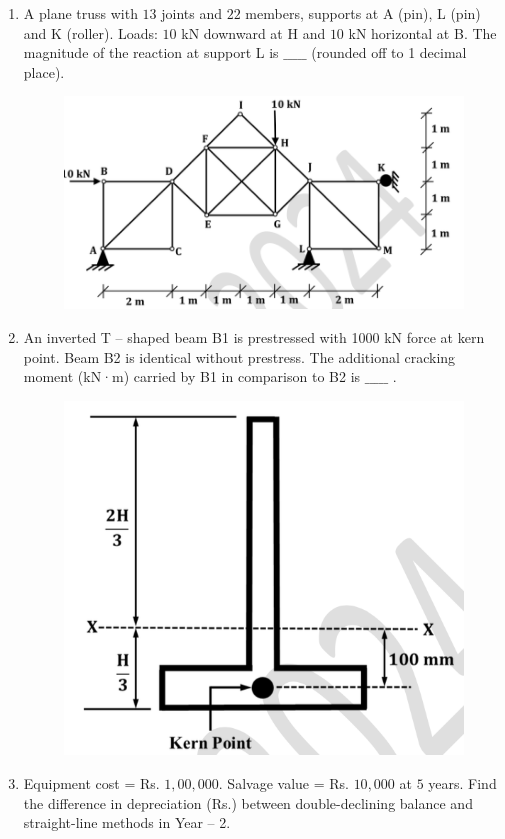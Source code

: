 \documentclass[journal]{IEEEtran}
\begin{document}
\begin{enumerate}
\item A plane truss with $13$ joints and $22$ members, supports at A (pin), L (pin) and K (roller). Loads: $10$ kN downward at H and $10$ kN horizontal at B. The magnitude of the reaction  at support L is $\_\_\_\_\_$ (rounded off to 1 decimal place).  
\hfill {}  
\begin{figure}[H]
    \centering
    \includegraphics[width=0.6\columnwidth]{figs/Q49.png} 
    \caption{}
    \label{fig:placeholder}
\end{figure}


\item An inverted T -- shaped beam B1 is prestressed with 1000 kN force at kern point. Beam B2 is identical without prestress. The additional cracking moment (kN·m) carried by B1 in comparison to B2 is $\_\_\_\_\_$ .  
\hfill {}  

\begin{figure}[H]
    \centering
    \includegraphics[width=0.6\columnwidth]{figs/Q50.png} 
    \caption{}
    \label{fig:placeholder}
\end{figure}

\item Equipment cost = Rs. $1,00,000$. Salvage value = Rs. $10,000$ at $5$ years. Find the difference in depreciation (Rs.) between double-declining balance and straight-line methods in Year -- 2.  
\hfill {}  


\end{enumerate}
\end{document}
